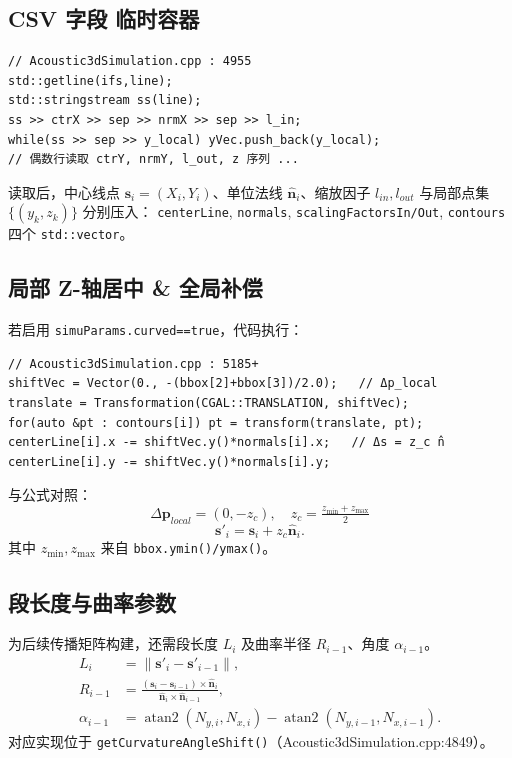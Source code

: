 \documentclass{ctexart}
\begin{document}
\subsection{CSV 字段 \textrightarrow{} 临时容器}
\begin{lstlisting}[caption={extractContoursFromCsvFile 关键片段},label={lst:csv_extract}]
// Acoustic3dSimulation.cpp : 4955
std::getline(ifs,line);
std::stringstream ss(line);
ss >> ctrX >> sep >> nrmX >> sep >> l_in;
while(ss >> sep >> y_local) yVec.push_back(y_local);
// 偶数行读取 ctrY, nrmY, l_out, z 序列 ...
\end{lstlisting}
读取后，中心线点 $\mathbf s_i=(X_i,Y_i)$、单位法线 $\hat{\mathbf n}_i$、缩放因子 $l_{in},l_{out}$ 与局部点集 $\{(y_k,z_k)\}$ 分别压入：
\texttt{centerLine}, \texttt{normals}, \texttt{scalingFactorsIn/Out}, \texttt{contours} 四个 \texttt{std::vector}。

\subsection{局部 Z-轴居中 \& 全局补偿}
若启用 \texttt{simuParams.curved==true}，代码执行：
\begin{lstlisting}[caption={局部居中与全局补偿实现},label={lst:center_shift}]
// Acoustic3dSimulation.cpp : 5185+
shiftVec = Vector(0., -(bbox[2]+bbox[3])/2.0);   // Δp_local
translate = Transformation(CGAL::TRANSLATION, shiftVec);
for(auto &pt : contours[i]) pt = transform(translate, pt);
centerLine[i].x -= shiftVec.y()*normals[i].x;   // Δs = z_c n̂
centerLine[i].y -= shiftVec.y()*normals[i].y;
\end{lstlisting}
与公式对照：
\begin{equation}
\Delta \mathbf p_{local}=(0,-z_c),\quad z_c=\tfrac{z_{\min}+z_{\max}}{2}
\end{equation}
\begin{equation}
\mathbf s'_i=\mathbf s_i+z_c\hat{\mathbf n}_i.
\end{equation}
其中 $z_{\min},z_{\max}$ 来自 \texttt{bbox.ymin()/ymax()}。

\subsection{段长度与曲率参数}
为后续传播矩阵构建，还需段长度 $L_i$ 及曲率半径 $R_{i-1}$、角度 $\alpha_{i-1}$。
\begin{align}
L_i &= \|\mathbf s'_{i}-\mathbf s'_{i-1}\|,\\
R_{i-1} &= \frac{(\mathbf s_i-\mathbf s_{i-1})\times\hat{\mathbf n}_i}{\hat{\mathbf n}_i\times\hat{\mathbf n}_{i-1}},\\
\alpha_{i-1} &= \operatorname{atan2}(N_{y,i},N_{x,i})-\operatorname{atan2}(N_{y,i-1},N_{x,i-1}).
\end{align}
对应实现位于 \texttt{getCurvatureAngleShift()}（Acoustic3dSimulation.cpp:4849）。
\end{document}

